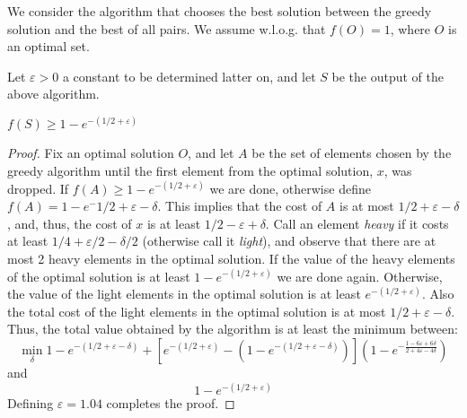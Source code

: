 We consider the algorithm that chooses the best solution between the greedy
solution and the best of all pairs.
We assume w.l.o.g. that $f(O) = 1$, where $O$ is an optimal set.

Let $\varepsilon > 0$ a constant to be determined latter on, and let $S$ be the output of 
the above algorithm.
\begin{theorem}
$f(S) \geq 1 - e^{-(1/2 + \varepsilon)}$
\end{theorem}

\begin{proof}
Fix an optimal solution $O$, 
and let $A$ be the set of elements chosen by the greedy algorithm 
until the first element from the optimal solution, $x$, was dropped. 
If $f(A) \geq 1 - e^{-(1/2 + \varepsilon)}$ we are done, otherwise define 
$f(A) = 1 - e^-{1/2 + \varepsilon - \delta}$. 
This implies that the cost of $A$ is at most $1/2 + \varepsilon - \delta$, and, thus, the 
cost of $x$ is at least $1/2 - \varepsilon + \delta$.
Call an element \emph{heavy} if it costs at least $1/4 + \varepsilon/2 - \delta/2$
(otherwise call it \emph{light}), 
and observe that there are at most 2 heavy elements in the optimal solution.
If the value of the heavy elements of the optimal solution 
is at least $1-e^{-(1/2 + \varepsilon)}$ we are done again. 
Otherwise, the value of the light elements in the optimal solution 
is at least $e^{-(1/2 + \varepsilon)}$.
Also the total cost of the light elements in the optimal solution 
is at most $1/2 + \varepsilon - \delta$.
Thus, the total value obtained by the algorithm is at least the minimum between:
$$
\min_\delta
1-e^{-(1/2 + \varepsilon - \delta)}
+
\left[
e^{-(1/2 + \varepsilon)}
-
(1-e^{-(1/2 + \varepsilon - \delta)})
\right]
(1-e^{-\frac{1-6\varepsilon + 6\delta}{2 + 4\varepsilon - 4\delta}})
$$ 
and
$$
1-e^{-(1/2 + \varepsilon)}
$$
Defining $\varepsilon = 1.04$ completes the proof. 
\end{proof}
